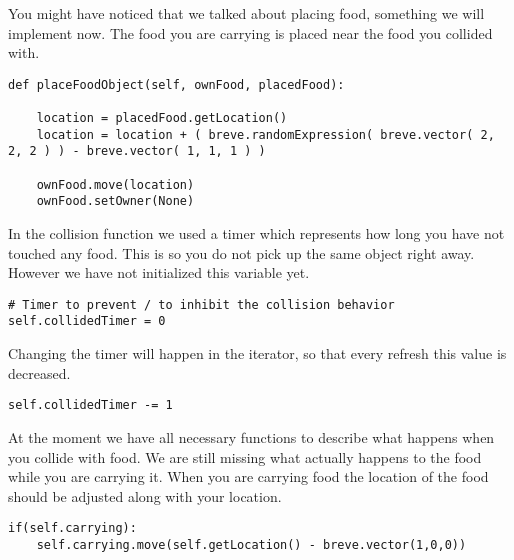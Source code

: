 You might have noticed that we talked about placing food, something we will implement now. The food you are carrying is placed near the food you collided with.

\begin{fullwidth}
\begin{lstlisting}
def placeFoodObject(self, ownFood, placedFood):

    location = placedFood.getLocation()
    location = location + ( breve.randomExpression( breve.vector( 2, 2, 2 ) ) - breve.vector( 1, 1, 1 ) )

    ownFood.move(location)
    ownFood.setOwner(None)
\end{lstlisting}
\end{fullwidth}

In the collision function we used a timer which represents how long you have not touched any food. This is so you do not pick up the same object right away. However we have not initialized this variable yet.
\begin{fullwidth}
\begin{lstlisting}
# Timer to prevent / to inhibit the collision behavior
self.collidedTimer = 0
\end{lstlisting}
\end{fullwidth}

Changing the timer will happen in the iterator, so that every refresh this value is decreased.

\begin{lstlisting}
self.collidedTimer -= 1
\end{lstlisting}

At the moment we have all necessary functions to describe what happens when you collide with food. We are still missing what actually happens to the food while you are carrying it. When you are carrying food the location of the food should be adjusted along with your location.
\begin{fullwidth}
\begin{lstlisting}
if(self.carrying):
    self.carrying.move(self.getLocation() - breve.vector(1,0,0))
\end{lstlisting}
\end{fullwidth}


